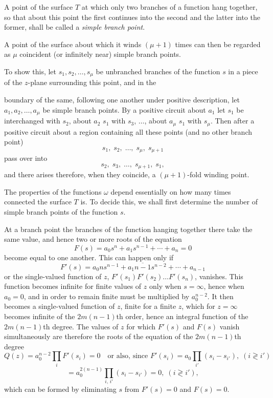 \documentclass{article}
\begin{document}
A point of the surface $T$ at which only two branches of a function hang together, so that about this point the first continues into the second and the latter into the former, shall be called a \emph{simple branch point}.

A point of the surface about which it winds $(\mu+1)$ times can then be regarded as $\mu$ coincident (or infinitely near) simple branch points.

To show this, let $s_{1}, s_{2}, \ldots, s_{\mu}$ be unbranched branches of the function $s$ in a piece of the $z$-plane surrounding this point, and in the

boundary of the same, following one another under positive description, let $a_{1}, a_{2}, \ldots, a_{\mu}$ be simple branch points. By a positive circuit about $a_{1}$ let $s_{1}$ be interchanged with $s_{2}$, about $a_{2}$ $s_{1}$ with $s_{3}$, $\ldots$, about $a_{\mu}$ $s_{1}$ with $s_{\mu}$. Then after a positive circuit about a region containing all these points (and no other branch point)
\[ s_{1}, \; s_{2}, \; \ldots, \; s_{\mu}, \; s_{\mu+1} \]
pass over into
\[ s_{2}, \; s_{3}, \; \ldots, \; s_{\mu+1}, \; s_{1}, \]
and there arises therefore, when they coincide, a $(\mu+1)$-fold winding point.

The properties of the functions $\omega$ depend essentially on how many times connected the surface $T$ is. To decide this, we shall first determine the number of simple branch points of the function $s$.

At a branch point the branches of the function hanging together there take the same value, and hence two or more roots of the equation
\[ F(s) = a_{0} s^{n} + a_{1} s^{n-1} + \cdots + a_{n} = 0 \]
become equal to one another. This can happen only if
\[ F'(s) = a_{0} n s^{n-1} + a_{1} \overline{n-1} s^{n-2} + \cdots + a_{n-1} \]
or the single-valued function of $z$, $F'(s_{1}) F'(s_{2}) \ldots F'(s_{n})$, vanishes. This function becomes infinite for finite values of $z$ only when $s = \infty$, hence when $a_{0} = 0$, and in order to remain finite must be multiplied by $a_{0}^{n-2}$. It then becomes a single-valued function of $z$, finite for a finite $z$, which for $z = \infty$ becomes infinite of the $2m(n-1)$th order, hence an integral function of the $2m(n-1)$th degree. The values of $z$ for which $F'(s)$ and $F(s)$ vanish simultaneously are therefore the roots of the equation of the $2m(n-1)$th degree
\[ Q(z) = a_{0}^{n-2} \prod_{i} F'(s_{i}) = 0 \quad \text{or also, since } F'(s_{i}) = a_{0} \prod_{i'}(s_{i} - s_{i'}), \; (i \gtrless i') \]
\[ = a_{0}^{2(n-1)} \prod_{i,\, i'} (s_{i} - s_{i'}) = 0, \; (i \gtrless i'), \]
which can be formed by eliminating $s$ from $F'(s) = 0$ and $F(s) = 0$.
\end{document}
